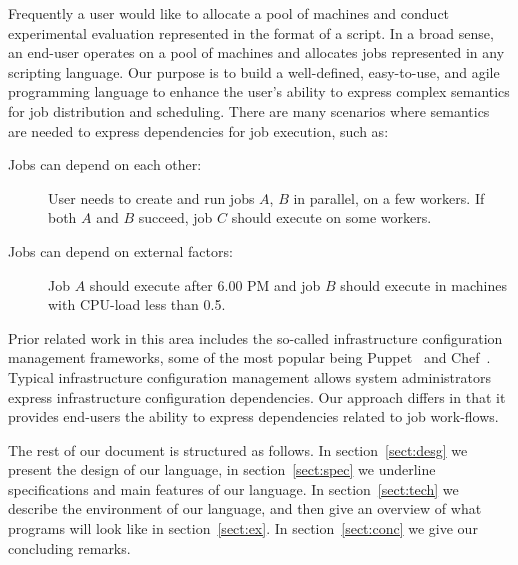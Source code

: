 
Frequently a user would like to allocate a pool of machines and conduct experimental evaluation represented in the format of a script. In a
broad sense, an end-user operates on a pool of machines and allocates jobs
represented in any scripting language. Our purpose is to build a well-defined,
easy-to-use, and agile programming language to enhance the user's ability to express complex semantics for job distribution and scheduling. There are many scenarios where semantics are needed to express dependencies for job execution, such as:
\begin{description}
\item[Jobs can depend on each other:] User needs to create and run jobs $A$,
$B$ in parallel, on a few workers. If both $A$ and $B$ succeed, job $C$ should
execute on some workers.
\item[Jobs can depend on external factors:] Job $A$ should execute after 6.00 PM
and job $B$ should execute in machines with CPU-load less than 0.5.
\end{description}

Prior related work in this area includes the so-called infrastructure
configuration management frameworks, some of the most popular being
Puppet~\cite{puppet} and Chef~\cite{chef}. Typical infrastructure
configuration management allows system administrators express
infrastructure configuration dependencies. Our approach differs in that
it provides end-users the ability to express dependencies related to
job work-flows.

The rest of our document is structured as follows. In section~\ref{sect:desg} we
present the design of our language, in section~\ref{sect:spec} we underline
specifications and main features of our language. In section~\ref{sect:tech} we
describe the environment of our language, and then give an overview of what
programs will look like in section~\ref{sect:ex}. In section~\ref{sect:conc} we
give our concluding remarks.


